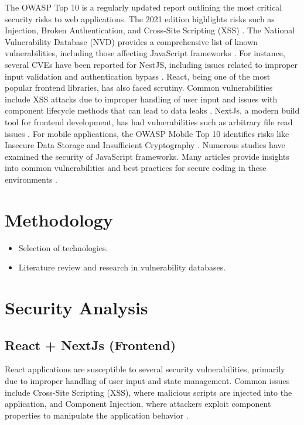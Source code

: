 \documentclass[conference]{IEEEtran}
\begin{document}
The OWASP Top 10 is a regularly updated report outlining the most critical security risks to web applications. 
The 2021 edition highlights risks such as Injection, Broken Authentication, and Cross-Site Scripting (XSS) \cite{owasp2021}. 
The National Vulnerability Database (NVD) provides a comprehensive list of known vulnerabilities, including those affecting JavaScript frameworks \cite{nvd}. For instance, several CVEs have been reported for NestJS, including issues related to improper input validation and authentication bypass \cite{cveNest}. React, being one of the most popular frontend libraries, has also faced scrutiny. Common vulnerabilities include XSS attacks due to improper handling of user input and issues with component lifecycle methods that can lead to data leaks \cite{reactSecurity, reactFlaw}. NextJs, a modern build tool for frontend development, has had vulnerabilities such as arbitrary file read issues \cite{NextJsFlaw}.
For mobile applications, the OWASP Mobile Top 10 identifies risks like Insecure Data Storage and Insufficient Cryptography \cite{owaspMobile}. Numerous studies have examined the security of JavaScript frameworks. Many articles provide insights into common vulnerabilities and best practices for secure coding in these environments \cite{reactNativeSec}.

\section{Methodology}
\begin{itemize}
    \item Selection of technologies.
    \item Literature review and research in vulnerability databases.
\end{itemize}

\section{Security Analysis}
\subsection{React + NextJs (Frontend)}
React applications are susceptible to several security vulnerabilities, primarily due to improper handling of user input and state management. Common issues include Cross-Site Scripting (XSS), where malicious scripts are injected into the application, and Component Injection, where attackers exploit component properties to manipulate the application behavior \cite{reactSecurity, reactFlaw}.
\end{document}
